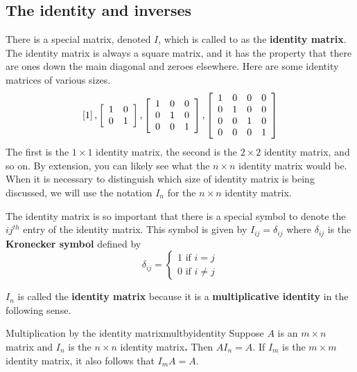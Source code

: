 \subsection{The identity and inverses}

There is a special matrix, denoted $I$, which is called
 to as the \textbf{identity matrix}. The identity matrix is always a square
matrix, and it has
the property that there are ones down the main diagonal and zeroes
elsewhere. Here are some identity matrices of various sizes.
\begin{equation*}
\left[ 1\right] ,\left[
\begin{array}{cc}
1 & 0 \\
0 & 1
\end{array}
\right] ,\left[
\begin{array}{ccc}
1 & 0 & 0 \\
0 & 1 & 0 \\
0 & 0 & 1
\end{array}
\right] ,\left[
\begin{array}{cccc}
1 & 0 & 0 & 0 \\
0 & 1 & 0 & 0 \\
0 & 0 & 1 & 0 \\
0 & 0 & 0 & 1
\end{array}
\right] 
\end{equation*}
The first is the $1\times 1$ identity matrix, the second is the $2\times 2$
identity matrix, and so on. By extension, you can likely see
what the $n\times n$ identity matrix would be. When it is necessary to distinguish 
which size of identity matrix is being discussed, we will use the 
notation $I_n$ for the $n \times n$ identity matrix. 

The identity matrix is so important that there
is a special symbol to denote the $ij^{th}$ entry of the identity matrix. This symbol is given by 
$I_{ij}=\delta _{ij}$ where $\delta _{ij}$ is the \textbf{Kronecker symbol}
defined
 by
\begin{equation*}
\delta _{ij}=\left\{
\begin{array}{c}
1
\text{ if }i=j \\
0\text{ if }i\neq j
\end{array}
\right.
\end{equation*}

$I_n$ is called the \textbf{identity matrix} because it is a \textbf{multiplicative identity} in the following sense.

\begin{lemma}{Multiplication by the identity matrix}{multbyidentity}
Suppose $A$ is an $m\times n$ matrix and $I_{n}$ is the $n\times n$ identity
matrix\textbf{.} Then $AI_{n}=A.$ If $I_{m}$ is the $m\times m$ identity
matrix, it also follows that $I_{m}A=A.$
\end{lemma}

